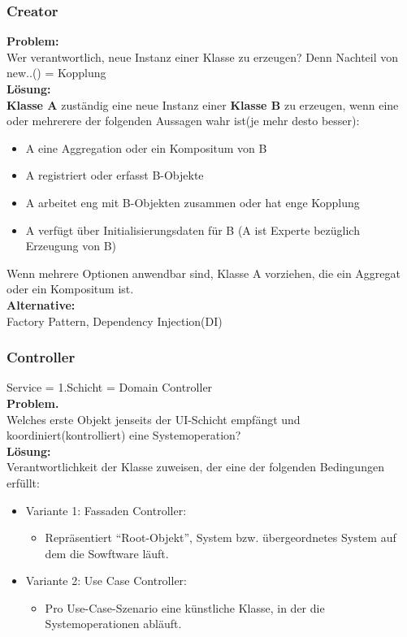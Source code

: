 \documentclass[../ZF_SWEN1.tex]{subfiles}
\begin{document}
\subsubsection{Creator}
\textbf{Problem:\\}
Wer verantwortlich, neue Instanz einer Klasse zu erzeugen? Denn Nachteil von new..() = Kopplung\\
\textbf{Lösung:\\}
\textbf {Klasse A} zuständig eine neue Instanz einer \textbf{Klasse B} zu erzeugen, wenn eine oder mehrerere der folgenden Aussagen wahr ist(je mehr desto besser):\\
\begin{itemize}
	\item A eine Aggregation oder ein Kompositum von B
	\item A registriert oder erfasst B-Objekte
	\item A arbeitet eng mit B-Objekten zusammen oder hat enge Kopplung
	\item A verfügt über Initialisierungsdaten für B (A ist Experte bezüglich Erzeugung von B)
\end{itemize}
Wenn mehrere Optionen anwendbar sind, Klasse A vorziehen, die ein Aggregat oder ein Kompositum ist.\\
\textbf{Alternative:\\}
Factory Pattern, Dependency Injection(DI)

\subsubsection{Controller}

Service = 1.Schicht = Domain Controller\\
\textbf{Problem.\\}
Welches erste Objekt jenseits der UI-Schicht empfängt und koordiniert(kontrolliert) eine Systemoperation?\\
\textbf{Lösung:\\}
Verantwortlichkeit der Klasse zuweisen, der eine der folgenden Bedingungen erfüllt:\\
\begin{itemize}
	\item Variante 1: Fassaden Controller:
	\begin{itemize}
		\item Repräsentiert "`Root-Objekt"', System bzw. übergeordnetes System auf dem die Sowftware läuft.
	\end{itemize}
	\item Variante 2: Use Case Controller:
	\begin{itemize}
		\item Pro Use-Case-Szenario eine künstliche Klasse, in der die Systemoperationen abläuft.
	\end{itemize}
\end{itemize}
\end{document}
